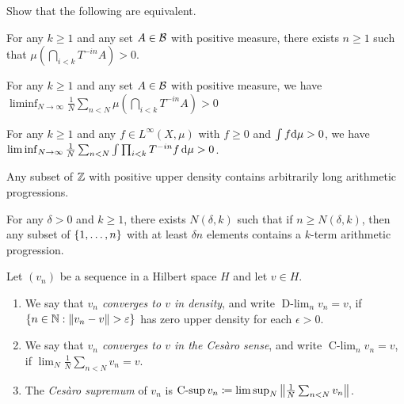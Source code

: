 \documentclass[reqno, twoside]{article}
\newcommand{\Clim}{\operatorname{C-lim}}
\newcommand{\Csup}{\operatorname{C-sup}}
\newcommand{\Dlim}{\operatorname{D-lim}}
\begin{document}
    \begin{exercise}
        Show that the following are equivalent.
        \begin{center}
            \begin{minipage}{0.95\textwidth}
                \begin{theorem*}
                    For any $k\geq1$ and any set $A\in\mathcal{B}$ with positive measure, there exists $n\geq1$ such that $\mu(\bigcap_{i<k}T^{-in}A)>0$.
                \end{theorem*}
                \begin{theorem*}
                    For any $k\geq1$ and any set $A\in\mathcal{B}$ with positive measure, we have $\liminf_{N\to\infty}\frac{1}{N}\sum_{n<N}\mu(\bigcap_{i<k}T^{-in}A)>0$
                \end{theorem*}
                \begin{theorem*}
                    For any $k\geq1$ and any $f\in L^\infty(X,\mu)$ with $f\geq0$ and $\int f\mathrm{d}\mu>0$, we have $\liminf_{N\to\infty}\frac{1}{N}\sum_{n<N}\int\prod_{i<k}T^{-in}f\,\mathrm{d}\mu>0$.
                \end{theorem*}
                \begin{theorem*}
                    Any subset of $\mathbb{Z}$ with positive upper density contains arbitrarily long arithmetic progressions.
                \end{theorem*}
                \begin{theorem*}
                    For any $\delta>0$ and $k\geq1$, there exists $N(\delta,k)$ such that if $n\geq N(\delta,k)$, then any subset of $\left\{1,\dots,n\right\}$ with at least $\delta n$ elements contains a $k$-term arithmetic progression.
                \end{theorem*}
            \end{minipage}
        \end{center}
    \end{exercise}

    \begin{definition*}
        Let $(v_n)$ be a sequence in a Hilbert space $H$ and let $v\in H$.
        \begin{enumerate}
            \item We say that \textit{$v_n$ converges to $v$ in density}, and write $\Dlim_nv_n=v$, if $\l\{n\in\N\st\l\|v_n-v\r\|>\epsilon\r\}$ has zero upper density for each $\epsilon>0$.
                \vspace{-0.05in}
            \item We say that \textit{$v_n$ converges to $v$ in the Cesàro sense}, and write $\Clim_nv_n=v$, if $\lim_N\frac{1}{N}\sum_{n<N}v_n=v$.
                \vspace{-0.05in}
            \item The \textit{Cesàro supremum} of $v_n$ is $\Csup v_n\coloneqq\limsup_N\l\|\frac{1}{N}\sum_{n<N}v_n\r\|$.
        \end{enumerate}
    \end{definition*}
\end{document}
